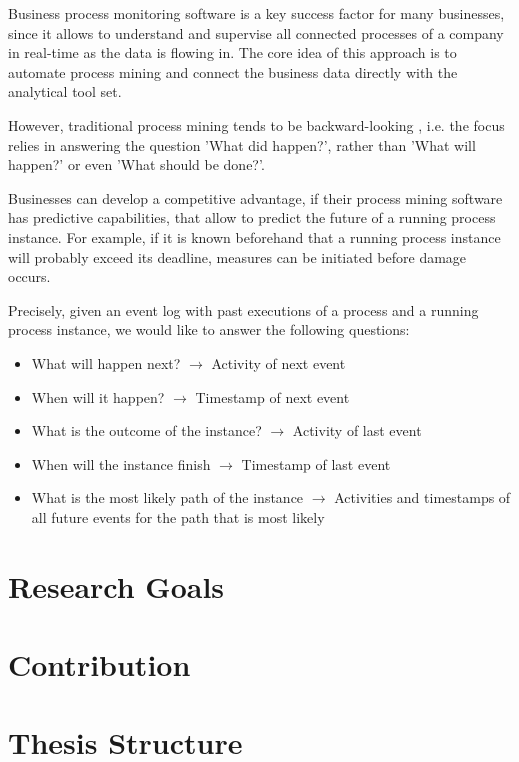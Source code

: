 Business process monitoring software is a key success factor for many businesses, since it allows to understand and supervise all connected processes of a company in real-time as the data is flowing in.
The core idea of this approach is to automate process mining and connect the business data directly with the analytical tool set.

However, traditional process mining tends to be backward-looking  \cite{DBLP:conf/scsc/Aalst18}, i.e. the focus relies in answering the question 'What did happen?', rather than 'What will happen?' or even 'What should be done?'.

Businesses can develop a competitive advantage, if their process mining software has predictive capabilities, that allow to predict the future of a running process instance.
For example, if it is known beforehand that a running process instance will probably exceed
its deadline, measures can be initiated before damage occurs.

Precisely, given an event log with past executions of a process and a running process instance, we would like to answer the following questions:

\begin{itemize}
	\item What will happen next? $\rightarrow$ Activity of next event
	\item When will it happen? $\rightarrow$ Timestamp of next event
	\item What is the outcome of the instance? $\rightarrow$ Activity of last event
	\item When will the instance finish $\rightarrow$ Timestamp of last event
	\item What is the most likely path of the instance $\rightarrow$  Activities and timestamps of all future events for the path that is most likely
\end{itemize}



\section{Research Goals}



\section{Contribution}

\section{Thesis Structure}